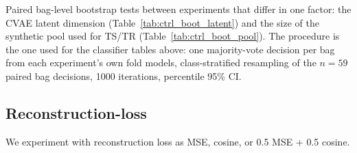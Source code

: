 
Paired bag-level bootstrap tests between experiments that differ in one factor: the CVAE latent dimension (Table~\ref{tab:ctrl_boot_latent}) and the size of the synthetic pool used for TS/TR (Table~\ref{tab:ctrl_boot_pool}). The procedure is the one used for the classifier tables above: one majority-vote decision per bag from each experiment's own fold models, class-stratified resampling of the $n=59$ paired bag decisions, 1000 iterations, percentile 95\% CI.




\subsection*{Reconstruction-loss}
\label{app:recon-loss}
We experiment with reconstruction loss as MSE, cosine, or 0.5 MSE + 0.5 cosine.
